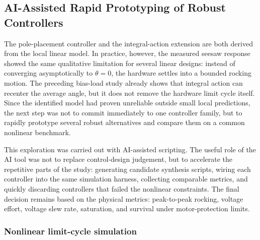\documentclass[11pt,a4paper]{article}
\begin{document}

\subsection{AI-Assisted Rapid Prototyping of Robust Controllers}
\label{sec:ai_robust_prototyping}

The pole-placement controller and the integral-action extension are both derived from the local linear model. In practice, however, the measured seesaw response showed the same qualitative limitation for several linear designs: instead of converging asymptotically to $\theta=0$, the hardware settles into a bounded rocking motion. The preceding bias-load study already shows that integral action can recenter the average angle, but it does not remove the hardware limit cycle itself. Since the identified model had proven unreliable outside small local predictions, the next step was not to commit immediately to one controller family, but to rapidly prototype several robust alternatives and compare them on a common nonlinear benchmark.

This exploration was carried out with AI-assisted scripting. The useful role of the AI tool was not to replace control-design judgement, but to accelerate the repetitive parts of the study: generating candidate synthesis scripts, wiring each controller into the same simulation harness, collecting comparable metrics, and quickly discarding controllers that failed the nonlinear constraints. The final decision remains based on the physical metrics: peak-to-peak rocking, voltage effort, voltage slew rate, saturation, and survival under motor-protection limits.

\subsubsection{Nonlinear limit-cycle simulation}
\label{sssec:nonlinear_limit_cycle_sim}
\end{document}
